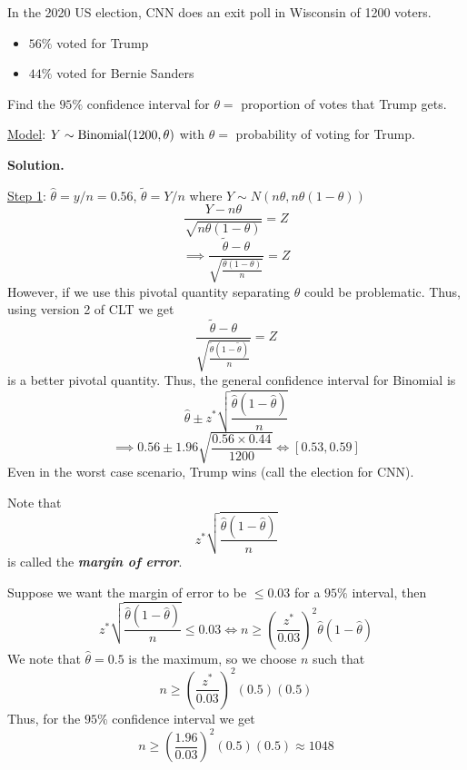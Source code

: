 \begin{exbox}
    \begin{example}
        In the 2020 US election, CNN does an exit poll in Wisconsin of 1200 voters.
        \begin{itemize}
            \item $ 56\% $ voted for Trump
            \item $ 44\% $ voted for Bernie Sanders
        \end{itemize}
        Find the $ 95\% $ confidence interval for $ \theta= $ proportion of votes that
        Trump gets.

        \underline{Model}: $ Y \sim \operatorname{Binomial}(1200,\theta) $ with $ \theta= $ probability of
        voting for Trump.

        \textbf{Solution.}

        \underline{Step 1}: $ \hat{\theta}=y/n=0.56 $, $ \tilde{\theta}=Y/n $
        where $ Y \sim N(n\theta,n\theta(1-\theta)) $
        \[ \frac{Y-n\theta}{\sqrt{n\theta(1-\theta)}}=Z  \]
        \[ \implies \frac{\tilde{\theta}-\theta}{\sqrt{\frac{\theta(1-\theta)}{n}}}=Z  \]
        However, if we use this pivotal quantity separating $ \theta $ could be problematic.
        Thus, using version 2 of CLT we get
        \[ \frac{\tilde{\theta}-\theta}{\sqrt{\frac{\tilde{\theta}(1-\tilde{\theta})}{n}}}=Z \]
        is a better pivotal quantity.
        Thus, the general confidence interval for Binomial is
        \[ \hat{\theta}\pm z^*\sqrt{\frac{\hat{\theta}\left(1-\hat{\theta}\right)}{n} } \]
        \[ \implies 0.56\pm 1.96\sqrt{\frac{0.56\times 0.44}{1200}}\iff \left[ 0.53,0.59 \right] \]
        Even in the worst case scenario, Trump wins (call the election for CNN).

        Note that
        \[ z^*\sqrt{\frac{\hat{\theta}\left(1-\hat{\theta}\right)} {n}} \]
        is called the \textbf{\emph{margin of error}}.

        Suppose we want the margin of error to be $ \leqslant 0.03 $ for a $ 95\% $ interval, then
        \[ z^*\sqrt{\frac{\hat{\theta}\left(1-\hat{\theta}\right)}{n}}\leqslant 0.03\iff
            n\geqslant \left( \frac{z^*}{0.03}  \right)^2\hat{\theta}\left(1-\hat{\theta}\right) \]
        We note that $ \hat{\theta}=0.5 $ is the maximum, so we choose $ n $ such that
        \[ n\geqslant \left( \frac{z^*}{0.03}  \right)^2(0.5)(0.5) \]
        Thus, for the $ 95\% $ confidence interval we get
        \[ n\geqslant \left( \frac{1.96}{0.03} \right)^2(0.5)(0.5)\approx 1048 \]
    \end{example}
\end{exbox}
